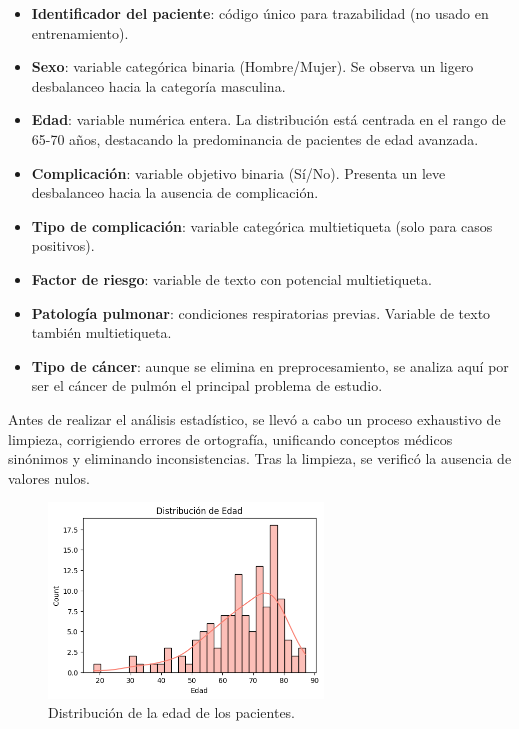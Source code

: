 \begin{itemize}
    \item \textbf{Identificador del paciente}: código único para trazabilidad (no usado en entrenamiento).
    \item \textbf{Sexo}: variable categórica binaria (Hombre/Mujer). Se observa un ligero desbalanceo hacia la categoría masculina.
    \item \textbf{Edad}: variable numérica entera. La distribución está centrada en el rango de 65-70 años, destacando la predominancia de pacientes de edad avanzada.
    \item \textbf{Complicación}: variable objetivo binaria (Sí/No). Presenta un leve desbalanceo hacia la ausencia de complicación.
    \item \textbf{Tipo de complicación}: variable categórica multietiqueta (solo para casos positivos).
    \item \textbf{Factor de riesgo}: variable de texto con potencial multietiqueta.
    \item \textbf{Patología pulmonar}: condiciones respiratorias previas. Variable de texto también multietiqueta.
    \item \textbf{Tipo de cáncer}: aunque se elimina en preprocesamiento, se analiza aquí por ser el cáncer de pulmón el principal problema de estudio.
\end{itemize}

Antes de realizar el análisis estadístico, se llevó a cabo un proceso exhaustivo de limpieza, corrigiendo errores de ortografía, unificando conceptos médicos sinónimos y eliminando inconsistencias. Tras la limpieza, se verificó la ausencia de valores nulos.


\begin{figure}[!htbp]
    \centering
    \includegraphics[width=0.65\textwidth]{img/histograma_dist_edad.png}
    \caption{Distribución de la edad de los pacientes.}
    \label{fig:distribucion_edad}
\end{figure}

